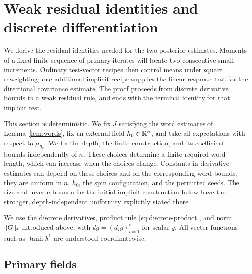 \section{Weak residual identities and discrete differentiation}
\label{sec:residuals}

We derive the residual identities needed for the two posterior estimates.
Moments of a fixed finite sequence of primary iterates will locate two
consecutive small increments. Ordinary test-vector recipes then control
means under square reweighting; one additional implicit recipe supplies
the linear-response test for the directional covariance estimate. The
proof proceeds from discrete derivative bounds to a weak residual rule,
and ends with the terminal identity for that implicit test.

This section is deterministic.  We fix $J$ satisfying the word estimates of
Lemma~\ref{lem:words}, fix an external field $h_0\in\mathbb R^n$, and take all
expectations with respect to $\mu_{h_0}$. We fix the depth, the finite
construction, and
its coefficient bounds independently of $n$. These choices determine a
finite required word length, which can increase when the choices change.
Constants
in derivative estimates can depend on these choices and on the corresponding
word bounds; they are uniform in $n$, $h_0$, the spin configuration, and the
permitted seeds.  The size and inverse bounds for the initial implicit
construction below have the stronger, depth-independent uniformity explicitly
stated there.

We use the discrete derivatives, product rule
\eqref{eq:discrete-product}, and norm $\lVert G\rVert_*$ introduced above,
with $dg=(d_i g)_{i=1}^n$ for scalar $g$.  All vector functions such as
$\tanh h^1$ are understood coordinatewise.

\subsection{Primary fields}

